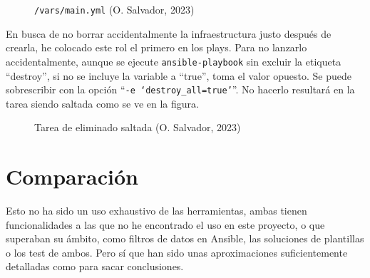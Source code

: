 \documentclass[11pt]{article}
\begin{document}
\begin{flushleft}
        \begin{figure}[htb]
			\centering
			\begin{subfigure}{.6\textwidth}
                \inputminted[fontsize=\scriptsize, firstline=24, lastline=33, linenos, frame=single, breaklines]{yaml}{../../ansible/parallel_ansible/roles/destroy/main.yml}
			\end{subfigure}
            \caption{ \texttt{/vars/main.yml} (O. Salvador, 2023)}
		\end{figure} 

    En busca de no borrar accidentalmente la infraestructura justo después de crearla, he colocado este rol el primero en los plays. Para no lanzarlo accidentalmente, aunque se ejecute \texttt{ansible-playbook} sin excluir la etiqueta ``destroy'', si no se incluye la variable a ``true'', toma el valor opuesto. Se puede sobrescribir con la opción ``\texttt{-e `destroy\_all=true'}''. No hacerlo resultará en la tarea siendo saltada como se ve en la figura.    
    \linebreak
    
        \begin{figure}[htb]
			\centering
			\caption{Tarea de eliminado saltada (O. Salvador, 2023)}
		\end{figure}







\clearpage
\section{Comparación}
Esto no ha sido un uso exhaustivo de las herramientas, ambas tienen funcionalidades a las que no he encontrado el uso en este proyecto, o que superaban su ámbito, como filtros de datos en Ansible, las soluciones de plantillas o los test de ambos. Pero sí que han sido unas aproximaciones suficientemente detalladas como para sacar conclusiones. 
\linebreak


\end{flushleft}
\end{document}

